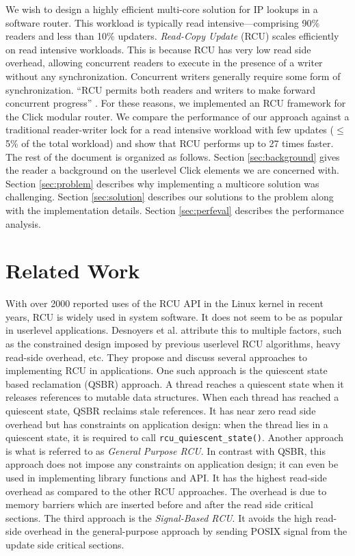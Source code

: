 \documentclass[a4paper]{article}
\begin{document}
We wish to design a highly efficient multi-core solution for IP lookups in a software router. This workload is typically read intensive---comprising 90\% readers and less than 10\% updaters. \emph{Read-Copy Update} (RCU) \cite{readcopyupdate} scales efficiently on read intensive workloads. This is because RCU has very low read side overhead, allowing concurrent readers to execute in the presence of a writer without any synchronization. Concurrent writers generally require some form of synchronization. ``RCU permits both readers and writers to make forward concurrent progress'' \cite{urcu}. For these reasons, we implemented an RCU framework for the Click modular router. We compare the performance of our approach against a traditional reader-writer lock for a read intensive workload with few updates ($\le$ 5\% of the total workload) and show that RCU performs up to 27 times faster.\\

The rest of the document is organized as follows. Section \ref{sec:background} gives the reader a background on the userlevel Click elements we are concerned with. Section \ref{sec:problem} describes why implementing a multicore solution was challenging. Section \ref{sec:solution} describes our solutions to the problem along with the implementation details. Section \ref{sec:perfeval} describes the performance analysis.
\section{Related Work}
With over 2000 reported uses of the RCU API \cite{rcuusage} in the Linux kernel in recent years, RCU is widely used in system software. It does not seem to be as popular in userlevel applications. Desnoyers et al. \cite{urcu} attribute this to multiple factors, such as the constrained design imposed by previous userlevel RCU algorithms, heavy read-side overhead, etc. They propose and discuss several approaches to implementing RCU in applications. One such approach is the quiescent state based reclamation (QSBR) approach. A thread reaches a quiescent state when it releases references to mutable data structures. When each thread has reached a quiescent state, QSBR reclaims stale references. It has near zero read side overhead but has constraints on application design: when the thread lies in a quiescent state, it is required to call \verb+rcu_quiescent_state()+. Another approach is what is referred to as \emph{General Purpose RCU}. In contrast with QSBR, this approach does not impose any constraints on application design; it can even be used in implementing library functions and API. It has the highest read-side overhead as compared to the other RCU approaches. The overhead is due to memory barriers which are inserted before and after the read side critical sections. The third approach is the \emph{Signal-Based RCU}. It avoids the high read-side overhead in the general-purpose approach by sending POSIX signal from the update side critical sections.
\end{document}
